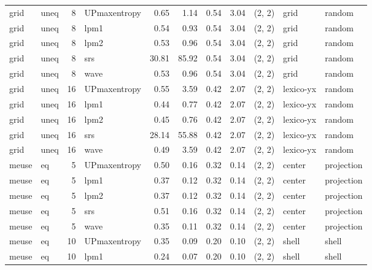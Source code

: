 \begin{tabular}{llrlrrrrlll}
  grid &  uneq &  8 & UPmaxentropy &  0.65 &     1.14 &   0.54 &       3.04 & (2, 2) &        grid &     random \\
  grid &  uneq &  8 &         lpm1 &  0.54 &     0.93 &   0.54 &       3.04 & (2, 2) &        grid &     random \\
  grid &  uneq &  8 &         lpm2 &  0.53 &     0.96 &   0.54 &       3.04 & (2, 2) &        grid &     random \\
  grid &  uneq &  8 &          srs & 30.81 &    85.92 &   0.54 &       3.04 & (2, 2) &        grid &     random \\
  grid &  uneq &  8 &         wave &  0.53 &     0.96 &   0.54 &       3.04 & (2, 2) &        grid &     random \\
  grid &  uneq & 16 & UPmaxentropy &  0.55 &     3.59 &   0.42 &       2.07 & (2, 2) &   lexico-yx &     random \\
  grid &  uneq & 16 &         lpm1 &  0.44 &     0.77 &   0.42 &       2.07 & (2, 2) &   lexico-yx &     random \\
  grid &  uneq & 16 &         lpm2 &  0.45 &     0.76 &   0.42 &       2.07 & (2, 2) &   lexico-yx &     random \\
  grid &  uneq & 16 &          srs & 28.14 &    55.88 &   0.42 &       2.07 & (2, 2) &   lexico-yx &     random \\
  grid &  uneq & 16 &         wave &  0.49 &     3.59 &   0.42 &       2.07 & (2, 2) &   lexico-yx &     random \\
 meuse &    eq &  5 & UPmaxentropy &  0.50 &     0.16 &   0.32 &       0.14 & (2, 2) &      center & projection \\
 meuse &    eq &  5 &         lpm1 &  0.37 &     0.12 &   0.32 &       0.14 & (2, 2) &      center & projection \\
 meuse &    eq &  5 &         lpm2 &  0.37 &     0.12 &   0.32 &       0.14 & (2, 2) &      center & projection \\
 meuse &    eq &  5 &          srs &  0.51 &     0.16 &   0.32 &       0.14 & (2, 2) &      center & projection \\
 meuse &    eq &  5 &         wave &  0.35 &     0.11 &   0.32 &       0.14 & (2, 2) &      center & projection \\
 meuse &    eq & 10 & UPmaxentropy &  0.35 &     0.09 &   0.20 &       0.10 & (2, 2) &       shell &      shell \\
 meuse &    eq & 10 &         lpm1 &  0.24 &     0.07 &   0.20 &       0.10 & (2, 2) &       shell &      shell \\

\end{tabular}
